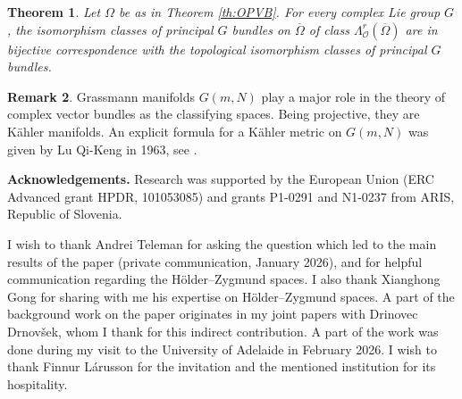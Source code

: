 \documentclass[11pt]{amsart}
\numberwithin{equation}{section}
\newtheorem{theorem}{Theorem}[section]
\theoremstyle{definition}
\newtheorem{remark}[theorem]{Remark}
\newcommand\Oscr{\mathscr{O}}
\begin{document}
\begin{theorem}\label{th:OPprincipalbundles}
Let $\Omega$ be as in Theorem \ref{th:OPVB}. 
For every complex Lie group $G$, the isomorphism classes of 
principal $G$ bundles on $\overline\Omega$ 
of class $\Lambda^r_\Oscr(\overline\Omega)$
are in bijective correspondence with the topological 
isomorphism classes of principal $G$ bundles.
\end{theorem}

%
% 
\begin{remark}\label{rem:Grassmann}
Grassmann manifolds $G(m,N)$ play a major role in the theory of 
complex vector bundles as the classifying spaces. Being projective, 
they are K\"ahler manifolds. An explicit formula
for a K\"ahler metric on $G(m,N)$ was given by Lu Qi-Keng in 
1963, see \cite{Lu-Qi-Keng1963I,Lu-Qi-Keng1963II}.
\end{remark}

% 
% 
% 
% 

\medskip \noindent
{\bf Acknowledgements.} 
Research was supported by the European Union 
(ERC Advanced grant HPDR, 101053085) and 
grants P1-0291 and N1-0237 from ARIS, Republic of Slovenia. 

I wish to thank Andrei Teleman for asking the question
which led to the main results of the paper (private communication,
January 2026), and for helpful communication regarding
the H\"older--Zygmund spaces. I also thank Xianghong Gong
for sharing with me his expertise on H\"older--Zygmund spaces.
A part of the background work on the paper originates in my 
joint papers \cite{DrinovecForstneric2007DMJ,DrinovecForstneric2008FM}
with Drinovec Drnov\v sek, whom I thank for this indirect contribution.
A part of the work was done during my visit to 
the University of Adelaide in February 2026. I wish to thank 
Finnur L\'arusson for the invitation and the mentioned 
institution for its hospitality.  

%
%

\end{document}
